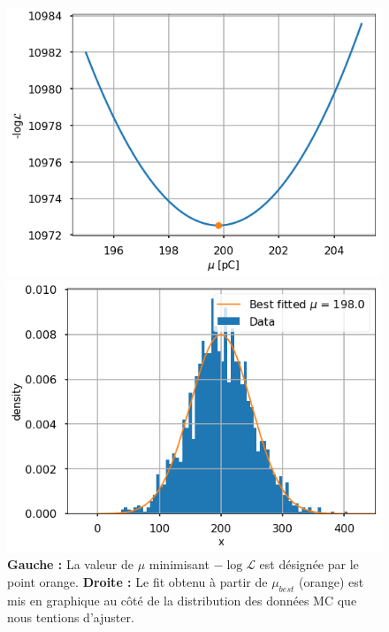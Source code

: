 \begin{figure}[h!]
    \centering
    \begin{minipage}[b]{0.49\linewidth}
    \includegraphics[width=\linewidth]{figures/MaxLikelihood.png}
    \end{minipage}
    \hfill
    \begin{minipage}[b]{0.49\linewidth}
    \includegraphics[width=\linewidth]{figures/MaxLikelihood_bestFit.png}
    \end{minipage}
    \caption{\textbf{Gauche :} La valeur de $\mu$ minimisant $-\log{\mathcal{L}}$ est désignée par le point orange. \textbf{Droite :} Le fit obtenu à partir de $\mu_{best}$ (orange) est mis en graphique au côté de la distribution des données MC que nous tentions d'ajuster.}
    \label{fig:MaxLikelihood}
\end{figure}



